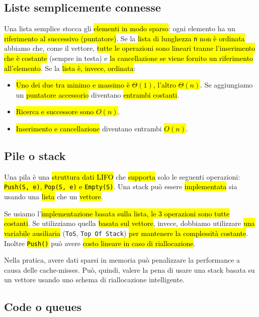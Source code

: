 \documentclass[a4paper,11pt,oneside]{article}
\theoremstyle{plain}
\theoremstyle{definition}
\theoremstyle{remark}
\begin{document}
\subsection{Liste semplicemente connesse}\label{sec:linked-list}

Una lista semplice stocca gli \hl{elementi in modo sparso}: ogni elemento ha un
\hl{riferimento al successivo (puntatore)}. Se la \hl{lista di lunghezza
\texttt{n} non è ordinata} abbiamo che, come il vettore, \hl{tutte le operazioni
sono lineari tranne l'inserimento che è costante} (sempre in testa) e \hl{la
cancellazione se viene fornito un riferimento all'elemento}. Se la \hl{lista è,
invece, ordinata}:

\begin{itemize}
  \item \hl{Uno dei due tra minimo e massimo è $\Theta(1)$, l'altro
    $\Theta(n)$}. Se aggiungiamo un \hl{puntatore accessorio} diventano
    \hl{entrambi costanti}.
  \item \hl{Ricerca e successore sono $O(n)$}.
  \item \hl{Inserimento e cancellazione} diventano entrambi \hl{$O(n)$}.
\end{itemize}

\subsection{Pile o stack}\label{sec:stack}

Una pila è una \hl{struttura dati LIFO} che \hl{supporta} solo le seguenti
operazioni: \hl{\texttt{Push(S, e)}, \texttt{Pop(S, e)} e \texttt{Empty(S)}}.
Una stack può essere \hl{implementata} sia usando una \hl{lista} che un
\hl{vettore}.

Se usiamo l'\hl{implementazione basata sulla lista, le 3 operazioni sono tutte
costanti}. Se utilizziamo quella \hl{basata sul vettore}, invece, dobbiamo
utilizzare \hl{una variabile ausiliaria} (\texttt{ToS}, \texttt{Top Of Stack})
\hl{per mantenere la complessità costante}. Inoltre \hl{\texttt{Push()}} può
avere \hl{costo lineare in caso di riallocazione}.

Nella pratica, avere dati sparsi in memoria può penalizzare la performance a
causa delle cache-misses. Può, quindi, valere la pena di usare una stack basata
su un vettore usando uno schema di riallocazione intelligente.

\subsection{Code o queues}\label{sec:queue}
\end{document}
